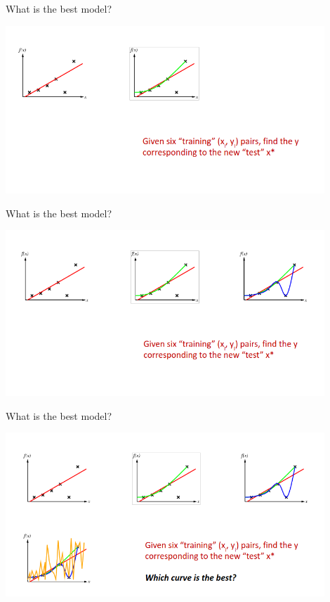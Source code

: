 \documentclass[aspectratio=169,14pt,usenames,dvipsnames]{beamer}
\begin{document}
\begin{frame}{What is the best model?}

\includegraphics[width=0.9\textwidth, height=0.8\textheight]{Images/AIML_OFG_3.png}

\end{frame}

\begin{frame}{What is the best model?}

\includegraphics[width=0.9\textwidth, height=0.8\textheight]{Images/AIML_OFG_4.png}

\end{frame}

\begin{frame}{What is the best model?}

\includegraphics[width=0.9\textwidth, height=0.75\textheight]{Images/AIML_OFG_5.png}

\end{frame}
\end{document}
